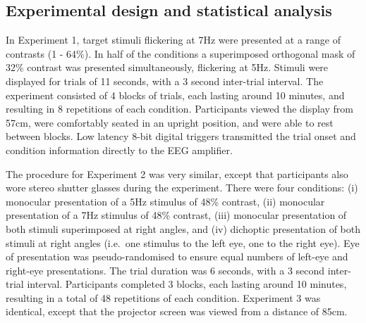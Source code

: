 \documentclass[
]{article}
\begin{document}
\hypertarget{experimental-design-and-statistical-analysis}{%
\subsection{Experimental design and statistical analysis}\label{experimental-design-and-statistical-analysis}}

In Experiment 1, target stimuli flickering at 7Hz were presented at a range of contrasts (1 - 64\%). In half of the conditions a superimposed orthogonal mask of 32\% contrast was presented simultaneously, flickering at 5Hz. Stimuli were displayed for trials of 11 seconds, with a 3 second inter-trial interval. The experiment consisted of 4 blocks of trials, each lasting around 10 minutes, and resulting in 8 repetitions of each condition. Participants viewed the display from 57cm, were comfortably seated in an upright position, and were able to rest between blocks. Low latency 8-bit digital triggers transmitted the trial onset and condition information directly to the EEG amplifier.

The procedure for Experiment 2 was very similar, except that participants also wore stereo shutter glasses during the experiment. There were four conditions: (i) monocular presentation of a 5Hz stimulus of 48\% contrast, (ii) monocular presentation of a 7Hz stimulus of 48\% contrast, (iii) monocular presentation of both stimuli superimposed at right angles, and (iv) dichoptic presentation of both stimuli at right angles (i.e.~one stimulus to the left eye, one to the right eye). Eye of presentation was pseudo-randomised to ensure equal numbers of left-eye and right-eye presentations. The trial duration was 6 seconds, with a 3 second inter-trial interval. Participants completed 3 blocks, each lasting around 10 minutes, resulting in a total of 48 repetitions of each condition. Experiment 3 was identical, except that the projector screen was viewed from a distance of 85cm.
\end{document}
